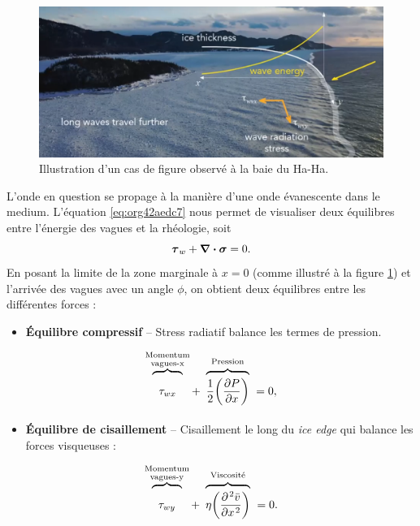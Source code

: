\documentclass[10pt]{article}
\numberwithin{equation}{section}
\newcommand{\short}{\vphantom{pA}}
\newcommand{\tall}{\vphantom{pA^{x^x}_p}}
\newcommand{\venti}{\vphantom{\sum_x^x}}
\newcommand{\pt}{\hspace{1pt}} %
\begin{document}
\begin{figure}[htbp]
\centering
\includegraphics[width=.9\linewidth]{Figures/photos/glace-evanescente.png}
\caption{\label{fig:org095837e}Illustration d'un cas de figure observé à la baie du Ha-Ha.}
\end{figure}

L'onde en question se propage à la manière d'une onde évanescente dans le medium.
L'équation \ref{eq:org42aedc7} nous permet de visualiser deux équilibres entre l'énergie des vagues et la rhéologie, soit
\begin{equation}
   \boldsymbol{\tau}_w + \divergence{\boldsymbol{\sigma}} = 0.
\end{equation}
En posant la limite de la zone marginale à \(x=0\) (comme illustré à la figure \ref{fig:org095837e}) et l'arrivée des vagues avec un angle \(\phi\), on obtient deux équilibres entre les différentes forces :\bigskip

\begin{itemize}
\item \textbf{Équilibre compressif} -- Stress radiatif balance les termes de pression.
\end{itemize}
\begin{equation}
\label{eq:orgf93f74c}
   \overbrace{\venti\phantom{x}\tau_{wx}\phantom{x}}^{\substack{\text{Momentum}\short\\\text{vagues-x}\short}} +\ \overbrace{\venti\frac{1}{2}\qty(\pdv{P}{x})}^{\text{Pression}\tall}\ = 0,
\end{equation}

\begin{itemize}
\item \textbf{Équilibre de cisaillement} -- Cisaillement le long du \emph{ice edge} qui balance les forces visqueuses :
\end{itemize}
\begin{equation}
   \overbrace{\venti\phantom{x}\tau_{wy}\phantom{x}}^{\substack{\text{Momentum}\short\\\text{vagues-y}\short}} +\ \overbrace{\venti\eta\qty(\pdv[\pt2]{\bar{v}}{x})}^{\text{Viscosité}\tall}\ = 0.
\end{equation}
\end{document}
